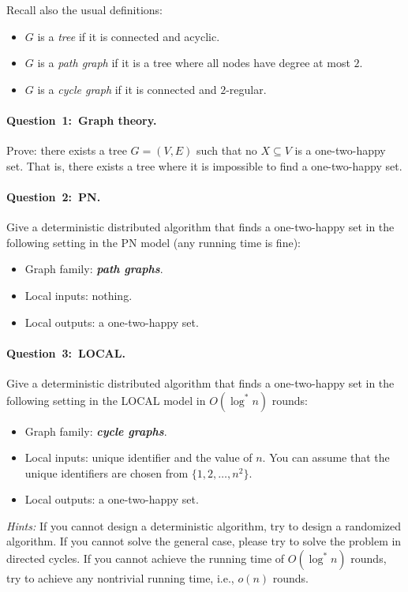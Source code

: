 \documentclass[12pt,a4paper]{article}
\newcommand{\q}[2]{\paragraph{\mbox{Question #1: }#2.}}
\newcommand{\cemph}[1]{\textbf{\emph{\boldmath #1}}}
\begin{document}
Recall also the usual definitions:
\begin{itemize}
    \item $G$ is a \emph{tree} if it is connected and acyclic.
    \item $G$ is a \emph{path graph} if it is a tree where all nodes have degree at most $2$.
    \item $G$ is a \emph{cycle graph} if it is connected and $2$-regular.
\end{itemize}


\newpage

\q{1}{Graph theory}

Prove: there exists a tree $G = (V,E)$ such that no $X \subseteq V$ is a one-two-happy set. That is, there exists a tree where it is impossible to find a one-two-happy set.

\q{2}{PN}

Give a deterministic distributed algorithm that finds a one-two-happy set in the following setting in the PN model (any running time is fine):
\begin{itemize}
    \item Graph family: \cemph{path graphs}.
    \item Local inputs: nothing.
    \item Local outputs: a one-two-happy set.
\end{itemize}

\q{3}{LOCAL}

Give a deterministic distributed algorithm that finds a one-two-happy set in the following setting in the LOCAL model in \cemph{$O(\log^* n)$} rounds:
\begin{itemize}
    \item Graph family: \cemph{cycle graphs}.
    \item Local inputs: unique identifier and the value of $n$. You can assume that the unique identifiers are chosen from $\{1,2,\dotsc,n^2\}$.
    \item Local outputs: a one-two-happy set.
\end{itemize}
\emph{Hints:} If you cannot design a deterministic algorithm, try to design a randomized algorithm. If you cannot solve the general case, please try to solve the problem in directed cycles. If you cannot achieve the running time of $O(\log^* n)$ rounds, try to achieve any nontrivial running time, i.e., $o(n)$ rounds.
\end{document}
